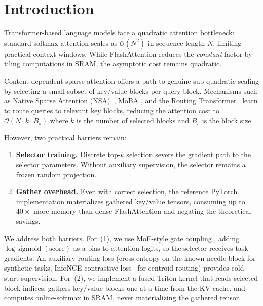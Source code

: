 \documentclass[10pt,letterpaper]{article}
\newcommand{\Ocomplex}{\mathcal{O}}
\newcommand{\LogSigmoid}{\operatorname{log\text{-}sigmoid}}
\begin{document}
\section{Introduction}\label{sec:intro}

Transformer-based language models face a quadratic attention bottleneck:
standard softmax attention scales as $\Ocomplex(N^2)$ in sequence length $N$,
limiting practical context windows. While FlashAttention
\cite{dao2022flashattention,dao2023flashattention2} reduces the \emph{constant}
factor by tiling computations in SRAM, the asymptotic cost remains quadratic.

Content-dependent sparse attention offers a path to genuine sub-quadratic
scaling by selecting a small subset of key/value blocks per query block.
Mechanisms such as Native Sparse Attention (NSA)~\cite{yuan2025nsa}, MoBA
\cite{lu2025moba}, and the Routing Transformer~\cite{roy2021routing} learn to
route queries to relevant key blocks, reducing the attention cost to
$\Ocomplex(N \cdot k \cdot B_s)$ where $k$ is the number of selected blocks
and $B_s$ is the block size.

However, two practical barriers remain:

\begin{enumerate}[leftmargin=*,itemsep=2pt]
\item \textbf{Selector training.} Discrete top-$k$ selection severs the
  gradient path to the selector parameters. Without auxiliary supervision, the
  selector remains a frozen random projection.
\item \textbf{Gather overhead.} Even with correct selection, the reference
  PyTorch implementation materializes gathered key/value tensors, consuming up
  to $40\times$ more memory than dense FlashAttention and negating the
  theoretical savings.
\end{enumerate}

We address both barriers. For~(1), we use MoE-style gate coupling
\cite{shazeer2017moe}, adding $\LogSigmoid(\text{score})$ as a bias to
attention logits, so the selector receives task gradients. An auxiliary
routing loss (cross-entropy on the known needle block for synthetic tasks,
InfoNCE contrastive loss~\cite{oord2018infonce} for centroid routing) provides
cold-start supervision. For~(2), we implement a fused Triton kernel
\cite{tillet2019triton} that reads selected block indices, gathers key/value
blocks one at a time from the KV cache, and computes online-softmax in
SRAM, never materializing the gathered tensor.
\end{document}
